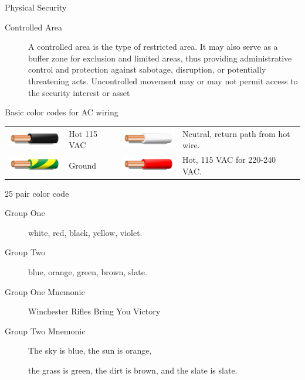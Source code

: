 \documentclass[landscape,fontscale=1,margin=0.2cm,paperwidth=70truecm, paperheight=40truecm,debug]{baposter}
\begin{document}
\begin{poster}
\begin{posterbox}[column=3,below=auto]{Physical Security}
\begin{description}
\item[Controlled Area] A controlled area is the \textbf{\color{orange}{least secure}} type of restricted area. It may also serve as a buffer zone for exclusion and limited areas, thus providing administrative control and protection against sabotage, disruption, or potentially threatening acts. Uncontrolled movement may or may not permit access to the security interest or asset
\end{description}
\end{posterbox}
\begin{posterbox}[column=3,below=auto,height=bottom]{Basic color codes for AC wiring}
\begin{tabular}{llll}
\includegraphics[scale=0.8]{Color_wire_black.png}& Hot 115 VAC & \includegraphics[scale=0.8]{Color_wire_white.png}&Neutral, return path from hot wire.\\
\includegraphics[scale=0.8]{Color_wire_green_yellow.png}& Ground & \includegraphics[scale=0.8]{Color_wire_red.png}& Hot, 115 VAC for 220-240 VAC.
\end{tabular}
\end{posterbox}
\begin{posterbox}[column=4]{25 pair color code}
\begin{description}
\item[Group One] white, red, black, yellow, violet.
\item[Group Two] blue, orange, green, brown, slate.
\end{description}
\begin{description}
\item[Group One Mnemonic] Winchester Rifles Bring You Victory
\item[Group Two Mnemonic] \color{blue} The sky is blue,\color{orange} the sun is orange,
\item [] \color{green} the grass is green, \color{brown} the dirt is brown, \color{gray} and the slate is slate.

\end{description}
\end{posterbox}
\end{poster}
\end{document}
